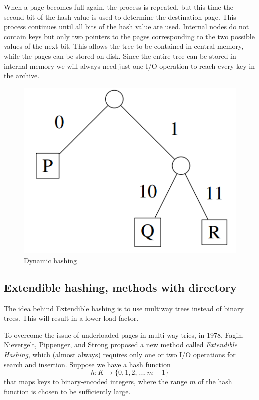 \documentclass{report}
\begin{document}
When a page becomes full again, the process is repeated, but this time the second bit of the hash value is used to determine the destination page. This process continues until all bits of the hash value are used.
Internal nodes do not contain keys but only two pointers to the pages corresponding to the two possible values of the next bit. This allows the tree to be contained in central memory, while the pages can be stored on disk. Since the entire tree can be stored in internal memory we will always need just one I/O operation to reach every key in the archive.
\begin{figure}
    \centering
    \includegraphics[scale=0.7]{img/hashdinamico.PNG}
    \caption{Dynamic hashing}
    \label{fig:dynamic_hash}
\end{figure}
\subsection{Extendible hashing, methods with directory}
The idea behind Extendible hashing is to use multiway trees instead of binary trees. This will result in a lower load factor.

To overcome the issue of underloaded pages in multi-way tries, in 1978, Fagin, Nievergelt, Pippenger, and Strong proposed a new method called \textit{Extendible Hashing}, which (almost always) requires only one or two I/O operations for search and insertion. Suppose we have a hash function 
\begin{equation}
h : K \rightarrow \{0,1,2,\ldots,m-1\}
\end{equation}
that maps keys to binary-encoded integers, where the range $m$ of the hash function is chosen to be sufficiently large.
\end{document}
